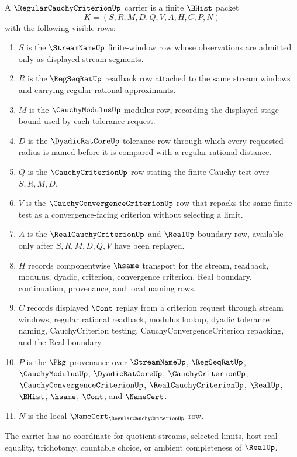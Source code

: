 \begin{definition}
\label{def:regular-cauchy-criterion-carrier}
A $\RegularCauchyCriterionUp$ carrier is a finite $\BHist$ packet
$$
K=(S,R,M,D,Q,V,A,H,C,P,N)
$$
with the following visible rows:
\begin{enumerate}
\item $S$ is the $\StreamNameUp$ finite-window row whose observations are admitted only as displayed stream segments.
\item $R$ is the $\RegSeqRatUp$ readback row attached to the same stream windows and carrying regular rational approximants.
\item $M$ is the $\CauchyModulusUp$ modulus row, recording the displayed stage bound used by each tolerance request.
\item $D$ is the $\DyadicRatCoreUp$ tolerance row through which every requested radius is named before it is compared with a regular rational distance.
\item $Q$ is the $\CauchyCriterionUp$ row stating the finite Cauchy test over $S,R,M,D$.
\item $V$ is the $\CauchyConvergenceCriterionUp$ row that repacks the same finite test as a convergence-facing criterion without selecting a limit.
\item $A$ is the $\RealCauchyCriterionUp$ and $\RealUp$ boundary row, available only after $S,R,M,D,Q,V$ have been replayed.
\item $H$ records componentwise $\hsame$ transport for the stream, readback, modulus, dyadic, criterion, convergence criterion, Real boundary, continuation, provenance, and local naming rows.
\item $C$ records displayed $\Cont$ replay from a criterion request through stream windows, regular rational readback, modulus lookup, dyadic tolerance naming, CauchyCriterion testing, CauchyConvergenceCriterion repacking, and the Real boundary.
\item $P$ is the $\Pkg$ provenance over $\StreamNameUp$, $\RegSeqRatUp$, $\CauchyModulusUp$, $\DyadicRatCoreUp$, $\CauchyCriterionUp$, $\CauchyConvergenceCriterionUp$, $\RealCauchyCriterionUp$, $\RealUp$, $\BHist$, $\hsame$, $\Cont$, and $\NameCert$.
\item $N$ is the local $\NameCert_{\RegularCauchyCriterionUp}$ row.
\end{enumerate}
The carrier has no coordinate for quotient streams, selected limits, host real equality, trichotomy, countable choice, or ambient completeness of $\RealUp$.
\end{definition}

